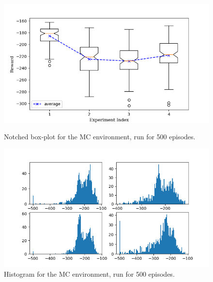 \documentclass[hidelinks,journal]{IEEEtran}
\begin{document}
\begin{appendices}
\begin{figure}[!h]
  \centering
  \includegraphics[scale=1]{graph/mc3ResBox.png}
  \caption{Notched box-plot for the MC environment, run for 500 episodes.}
  \includegraphics[scale=1]{graph/mc3ResHist.png}
  \caption{Histogram for the MC environment, run for 500 episodes.}
\end{figure}

\pagebreak


\end{appendices}
\end{document}
